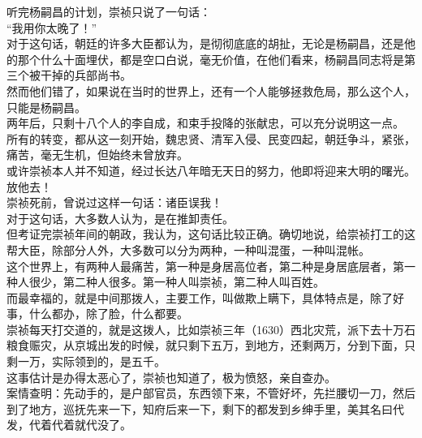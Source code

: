 \begin{multicols}{\theparacolNo}
听完杨嗣昌的计划，崇祯只说了一句话：\\

“我用你太晚了！”\\

对于这句话，朝廷的许多大臣都认为，是彻彻底底的胡扯，无论是杨嗣昌，还是他的那个什么十面埋伏，都是空口白说，毫无价值，在他们看来，杨嗣昌同志将是第三个被干掉的兵部尚书。\\

然而他们错了，如果说在当时的世界上，还有一个人能够拯救危局，那么这个人，只能是杨嗣昌。\\

两年后，只剩十八个人的李自成，和束手投降的张献忠，可以充分说明这一点。\\

所有的转变，都从这一刻开始，魏忠贤、清军入侵、民变四起，朝廷争斗，紧张，痛苦，毫无生机，但始终未曾放弃。\\

或许崇祯本人并不知道，经过长达八年暗无天日的努力，他即将迎来大明的曙光。\\

放他去！\\

崇祯死前，曾说过这样一句话：诸臣误我！\\

对于这句话，大多数人认为，是在推卸责任。\\

但考证完崇祯年间的朝政，我认为，这句话比较正确。确切地说，给崇祯打工的这帮大臣，除部分人外，大多数可以分为两种，一种叫混蛋，一种叫混帐。\\

这个世界上，有两种人最痛苦，第一种是身居高位者，第二种是身居底层者，第一种人很少，第二种人很多。第一种人叫崇祯，第二种人叫百姓。\\

而最幸福的，就是中间那拨人，主要工作，叫做欺上瞒下，具体特点是，除了好事，什么都办，除了脸，什么都要。\\

崇祯每天打交道的，就是这拨人，比如崇祯三年（1630）西北灾荒，派下去十万石粮食赈灾，从京城出发的时候，就只剩下五万，到地方，还剩两万，分到下面，只剩一万，实际领到的，是五千。\\

这事估计是办得太恶心了，崇祯也知道了，极为愤怒，亲自查办。\\

案情查明：先动手的，是户部官员，东西领下来，不管好坏，先拦腰切一刀，然后到了地方，巡抚先来一下，知府后来一下，剩下的都发到乡绅手里，美其名曰代发，代着代着就代没了。\\


\end{multicols}
